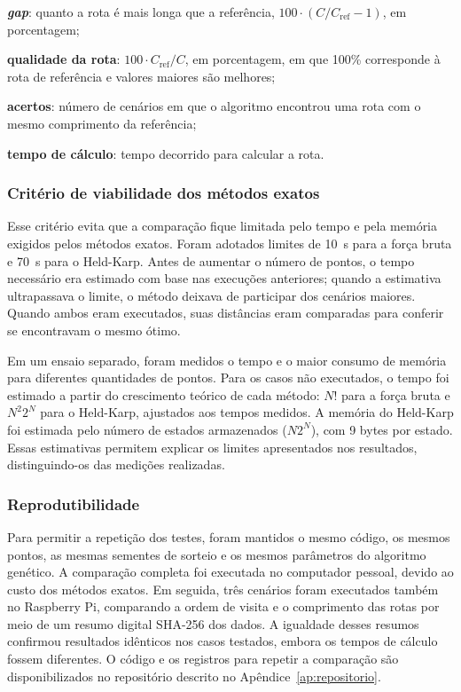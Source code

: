 \begin{alineastcc}
    \item \textbf{\textit{gap}}: quanto a rota é mais longa que a referência, $100 \cdot (C/C_{\mathrm{ref}} - 1)$, em porcentagem;
    \item \textbf{qualidade da rota}: $100 \cdot C_{\mathrm{ref}}/C$, em porcentagem, em que 100\% corresponde à rota de referência e valores maiores são melhores;
    \item \textbf{acertos}: número de cenários em que o algoritmo encontrou uma rota com o mesmo comprimento da referência;
    \item \textbf{tempo de cálculo}: tempo decorrido para calcular a rota.
\end{alineastcc}

\subsubsection{Critério de viabilidade dos métodos exatos}\label{subsubsec:rotas_viabilidade}

Esse critério evita que a comparação fique limitada pelo tempo e pela memória exigidos pelos métodos exatos. Foram adotados limites de 10~s para a força bruta e 70~s para o Held-Karp. Antes de aumentar o número de pontos, o tempo necessário era estimado com base nas execuções anteriores; quando a estimativa ultrapassava o limite, o método deixava de participar dos cenários maiores. Quando ambos eram executados, suas distâncias eram comparadas para conferir se encontravam o mesmo ótimo.

Em um ensaio separado, foram medidos o tempo e o maior consumo de memória para diferentes quantidades de pontos. Para os casos não executados, o tempo foi estimado a partir do crescimento teórico de cada método: $N!$ para a força bruta e $N^2 2^N$ para o Held-Karp, ajustados aos tempos medidos. A memória do Held-Karp foi estimada pelo número de estados armazenados ($N2^N$), com 9 bytes por estado. Essas estimativas permitem explicar os limites apresentados nos resultados, distinguindo-os das medições realizadas.

\subsubsection{Reprodutibilidade}\label{subsubsec:rotas_reprodutibilidade}

Para permitir a repetição dos testes, foram mantidos o mesmo código, os mesmos pontos, as mesmas sementes de sorteio e os mesmos parâmetros do algoritmo genético. A comparação completa foi executada no computador pessoal, devido ao custo dos métodos exatos. Em seguida, três cenários foram executados também no Raspberry Pi, comparando a ordem de visita e o comprimento das rotas por meio de um resumo digital SHA-256 dos dados. A igualdade desses resumos confirmou resultados idênticos nos casos testados, embora os tempos de cálculo fossem diferentes. O código e os registros para repetir a comparação são disponibilizados no repositório descrito no Apêndice~\ref{ap:repositorio}.

